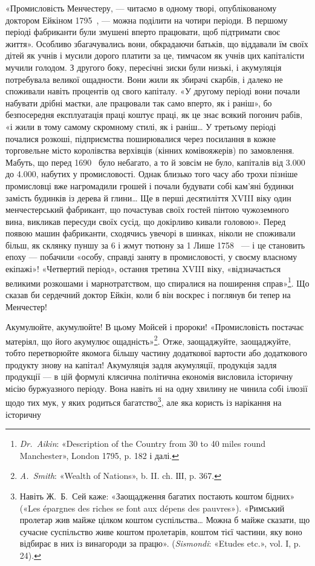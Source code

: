 
«Промисловість Менчестеру, — читаємо в одному творі, опублікованому
доктором Ейкіном 1795~, — можна поділити на
чотири періоди. В першому періоді фабриканти були змушені
вперто працювати, щоб підтримати своє життя». Особливо збагачувались
вони, обкрадаючи батьків, що віддавали їм своїх дітей
як учнів і мусили дорого платити за це, тимчасом як учнів цих
капіталісти мучили голодом. З другого боку, пересічні зиски
були низькі, і акумуляція потребувала великої ощадности.
Вони жили як збирачі скарбів, і далеко не споживали навіть
процентів од свого капіталу. «У другому періоді вони почали
набувати дрібні маєтки, але працювали так само вперто, як і
раніш», бо безпосередня експлуатація праці коштує праці, як
це знає всякий погонич рабів, «і жили в тому самому скромному
стилі, як і раніш\dots{} У третьому періоді почалися розкоші, підприємства
поширювалися через посилання в кожне торговельне
місто королівства верхівців (кінних комівояжерів) по замовлення.
Мабуть, що перед 1690~ було небагато, а то й зовсім не було,
капіталів від \num{3.000} до \num{4.000}, набутих у промисловості.
Однак близько того часу або трохи пізніше промисловці
вже нагромадили грошей і почали будувати собі кам’яні
будинки замість будинків із дерева й глини\dots{} Ще в перші десятиліття
XVIII віку один менчестерський фабрикант, що почастував
своїх гостей пінтою чужоземного вина, викликав пересуди
своїх сусід, що докірливо кивали головою». Перед появою машин
фабриканти, сходячись увечорі в шинках, ніколи не споживали
більш, як склянку пуншу за 6 і жмут тютюну за 1
Лише 1758~ — і це становить епоху — побачили «особу, справді
заняту в промисловості, у своєму власному екіпажі»! «Четвертий
період», остання третина XVIII віку, «відзначається великими
розкошами і марнотратством, що спиралися на поширення
справ»\footnote{
\emph{Dr.~Aikin}: «Description of the Country from 30 to 40 miles round
Manchester», London 1795, p. 182 і далі.
}. Що сказав би сердечний доктор Ейкін, коли б він
воскрес і поглянув би тепер на Менчестер!

Акумулюйте, акумулюйте! В цьому Мойсей і пророки! «Промисловість
постачає матеріял, що його акумулює ощадність»\footnote{
\emph{A.~Smith}: «Wealth of Nations», b. II. ch. ІІІ, p. 367.
}.
Отже, заощаджуйте, заощаджуйте, тобто перетворюйте якомога
більшу частину додаткової вартости або додаткового продукту
знову на капітал! Акумуляція задля акумуляції, продукція
задля продукції — в цій формулі клясична політична економія
висловила історичну місію буржуазного періоду. Вона навіть ні
на одну хвилину не чинила собі ілюзії щодо тих мук, у яких родиться
багатство\footnote{
Навіть Ж.~Б.~Сей каже: «Заощадження багатих постають коштом
бідних» («Les épargnes des riches se font aux dépens des pauvres»). «Римський
пролетар жив майже цілком коштом суспільства\dots{} Можна б майже
сказати, що сучасне суспільство живе коштом пролетарів, коштом тієї
частини, яку воно відбирає в них із винагороди за працю». (\emph{Sismondi}:
«Etudes etc.», vol. I, p. 24).
}, але яка користь із нарікання на історичну
\parbreak{}  %

